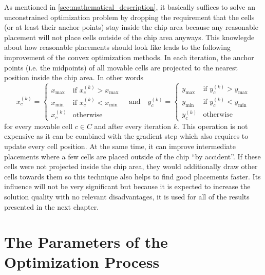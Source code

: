 As mentioned in \cref{sec:mathematical_description}, it basically suffices to solve an unconstrained optimization problem
by dropping the requirement that the cells (or at least their anchor points) stay inside the chip area
because any reasonable placement will not place cells outside of the chip area anyways.
This knowlegde about how reasonable placements should look like
leads to the following improvement of the convex optimization methods.
In each iteration, the anchor points (i.e. the midpoints) of all movable cells are projected to
the nearest position inside the chip area.
In other words
\[ 
   x_c^{(k)} = \begin{cases}
                x_{\max} & \text{if } x_c^{(k)} > x_{\max} \\
                x_{\min} & \text{if } x_c^{(k)} < x_{\min} \\
                x_c^{(k)} & \text{otherwise}
               \end{cases}
   \quad \text{and} \quad
   y_c^{(k)} = \begin{cases}
                y_{\max} & \text{if } y_c^{(k)} > y_{\max} \\
                y_{\min} & \text{if } y_c^{(k)} < y_{\min} \\
                y_c^{(k)} & \text{otherwise}
               \end{cases}
\]
for every movable cell \(c \in C\) and after every iteration \(k\).
This operation is not expensive as it can be combined with the gradient step
which also requires to update every cell position.
At the same time, it can improve intermediate placements
where a few cells are placed outside of the chip \enquote{by accident}.
If these cells were not projected inside the chip area,
they would additionally draw other cells towards them
so this technique also helps to find good placements faster.
Its influence will not be very significant
but because it is expected to increase the solution quality
with no relevant disadvantages, it is used for all of the results presented in the next chapter.



\section{The Parameters of the Optimization Process} \label{sec:parameters}

